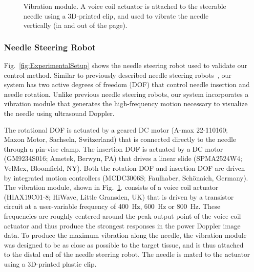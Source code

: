 \begin{figure}[!t]
\caption[Vibration module]{Vibration module. A voice coil actuator is attached to the steerable needle using a 3D-printed clip, and used to vibrate the needle vertically (in and out of the page).}
\label{fig:Vibrator}
\end{figure}

\subsubsection{Needle Steering Robot}
Fig.~\ref{fig:ExperimentalSetup} shows the needle steering robot used to validate our control method. Similar to previously described needle steering robots~\cite{Webster2005}, our system has two active degrees of freedom (DOF) that control needle insertion and needle rotation. Unlike previous needle steering robots, our system incorporates a vibration module that generates the high-frequency motion necessary to visualize the needle using ultrasound Doppler.

The rotational DOF is actuated by a geared DC motor (A-max 22-110160; Maxon Motor, Sachseln, Switzerland) that is connected directly to the needle through a pin-vise clamp. The insertion DOF is actuated by a DC motor (GM9234S016; Ametek, Berwyn, PA) that drives a linear slide (SPMA2524W4; VelMex, Bloomfield, NY). Both the rotation DOF and insertion DOF are driven by integrated motion controllers (MCDC3006S; Faulhaber, Schönaich, Germany). The vibration module, shown in Fig.~\ref{fig:Vibrator}, consists of a voice coil actuator (HIAX19C01-8; HiWave, Little Gransden, UK) that is driven by a transistor circuit at a user-variable frequency of 400~Hz, 600~Hz or 800~Hz. These frequencies are roughly centered around the peak output point of the voice coil actuator and thus produce the strongest responses in the power Doppler image data. To produce the maximum vibration along the needle, the vibration module was designed to be as close as possible to the target tissue, and is thus attached to the distal end of the needle steering robot. The needle is mated to the actuator using a 3D-printed plastic clip.

